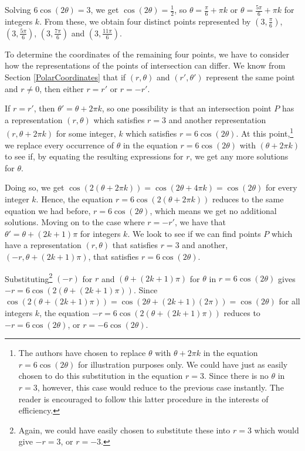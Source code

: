 \documentclass{ximera}
\begin{document}
\begin{example}
\begin{explanation}
\begin{enumerate}
Solving $6\cos(2\theta) = 3$, we get $\cos(2\theta) = \frac{1}{2}$, so  $\theta = \frac{\pi}{6} + \pi k$  or $\theta = \frac{5\pi}{6} + \pi k$ for integers $k$.  From these, we obtain  four distinct points represented by $\left(3, \frac{\pi}{6}\right)$, $\left(3, \frac{5\pi}{6} \right)$, $\left(3, \frac{7\pi}{6}\right)$ and $\left(3, \frac{11\pi}{6} \right)$.  
 

 To determine the coordinates of the remaining four points, we have to consider how the representations of the points of intersection can differ.  We know from Section \ref{PolarCoordinates} that if $(r,\theta)$ and $(r', \theta')$ represent the same point and $r \neq 0$, then either $r = r'$ or $r = -r'$.  
 
 
 
 If $r = r'$, then $\theta' = \theta + 2\pi k$, so one possibility is that an intersection point $P$ has a representation $(r,\theta)$ which satisfies $r=3$  and another representation $(r, \theta + 2\pi k)$ for some integer, $k$ which satisfies $r = 6\cos(2\theta)$.   At this point,\footnote{The authors have chosen to replace $\theta$ with $\theta + 2\pi k$ in the equation $r = 6\cos(2\theta)$ for illustration purposes only.  We could have just as easily chosen to do this substitution in the equation $r = 3$.  Since there is no $\theta$ in $r=3$, however, this case would reduce to the previous case instantly.  The reader is encouraged to follow this latter procedure in the interests of efficiency.} we replace every occurrence of $\theta$ in the equation $r=6\cos(2\theta)$ with $(\theta + 2\pi k)$ to see if, by equating the resulting expressions for $r$, we get any more solutions for $\theta$. 
 
 
 
Doing so, we get $\cos(2(\theta + 2\pi k)) = \cos(2\theta + 4\pi k) = \cos(2\theta)$ for every integer $k$.  Hence, the equation $r = 6\cos(2(\theta + 2\pi k))$ reduces to the same equation we had before, $r = 6\cos(2\theta)$,  which means we get no additional solutions.     
  Moving on to the case where $r = -r'$, we have that $\theta' = \theta + (2k+1)\pi$ for integers $k$.  We look to see if we can find points $P$ which have a representation $(r,\theta)$ that satisfies $r=3$  and another, $(-r, \theta + (2k+1)\pi)$, that satisfies  $r = 6\cos(2\theta)$.  
 
 
 Substituting\footnote{Again, we could have easily chosen to substitute these into $r=3$ which would give $-r=3$, or $r=-3$.}   $(-r)$ for $r$ and  $(\theta + (2k+1)\pi)$ for $\theta$ in  $r = 6\cos(2\theta)$ gives $-r = 6\cos(2(\theta + (2k+1)\pi))$.  Since $\cos(2(\theta + (2k+1)\pi)) = \cos(2\theta + (2k+1)(2\pi)) = \cos(2\theta)$ for all integers $k$, the equation $-r = 6\cos(2(\theta + (2k+1)\pi))$ reduces to $-r = 6\cos(2\theta)$, or $r = -6\cos(2\theta)$.   
 

\end{enumerate}
\end{explanation}
\end{example}
\end{document}
